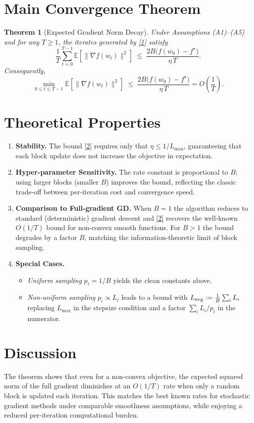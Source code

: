 \documentclass{article}
\newtheorem{theorem}{Theorem}
\newcommand{\E}{\mathbb{E}}
\newcommand{\norm}[1]{\lVert #1\rVert}
\begin{document}
\section*{Main Convergence Theorem}
\begin{theorem}[Expected Gradient Norm Decay]\label{thm:main}
Under Assumptions (A1)–(A5) and for any $T\ge1$, the iterates generated by
\eqref{1} satisfy
\[
\frac{1}{T}\sum_{t=0}^{T-1}\E\!\left[\norm{\nabla f(w_t)}^{2}\right]
\;\le\;
\frac{2B\big(f(w_0)-f^\star\big)}{\eta\,T}.
\tag{2}
\]
Consequently,
\[
\min_{0\le t\le T-1}\E\!\left[\norm{\nabla f(w_t)}^{2}\right]
\;\le\;
\frac{2B\big(f(w_0)-f^\star\big)}{\eta\,T}
= O\!\left(\frac{1}{T}\right).
\]
\end{theorem}

\section*{Theoretical Properties}
\begin{enumerate}[label=\arabic*.]
\item \textbf{Stability.} The bound \eqref{2} requires only that
$\eta\le 1/L_{\max}$, guaranteeing that each block update does not increase
the objective in expectation.
\item \textbf{Hyper‑parameter Sensitivity.}
The rate constant is proportional to $B$; using larger blocks (smaller $B$)
improves the bound, reflecting the classic trade‑off between per‑iteration
cost and convergence speed.
\item \textbf{Comparison to Full‑gradient GD.}
When $B=1$ the algorithm reduces to standard (deterministic) gradient descent
and \eqref{2} recovers the well‑known $O(1/T)$ bound for non‑convex smooth
functions.  For $B>1$ the bound degrades by a factor $B$, matching the
information‑theoretic limit of block sampling.
\item \textbf{Special Cases.}
\begin{itemize}
\item \emph{Uniform sampling} $p_i=1/B$ yields the clean constants above.
\item \emph{Non‑uniform sampling} $p_i\propto L_i$ leads to a bound with
$L_{\rm avg}:=\frac{1}{B}\sum_i L_i$ replacing $L_{\max}$ in the stepsize
condition and a factor $\sum_i L_i/p_i$ in the numerator.
\end{itemize}
\end{enumerate}

\section*{Discussion}
The theorem shows that even for a non‑convex objective, the expected squared
norm of the full gradient diminishes at an $O(1/T)$ rate when only a random
block is updated each iteration.  This matches the best known rates for
stochastic gradient methods under comparable smoothness assumptions,
while enjoying a reduced per‑iteration computational burden.
\end{document}
